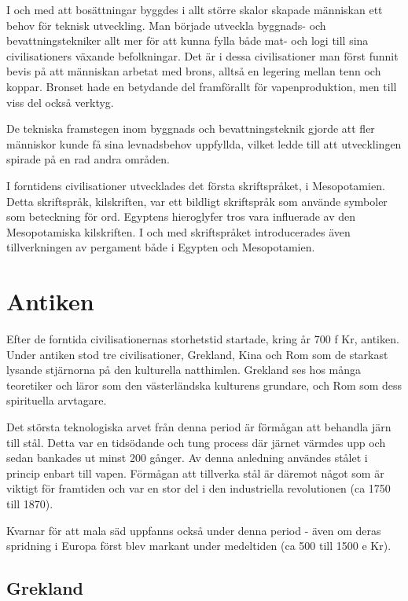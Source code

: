 \documentclass[a4paper,12pt,fleqn]{article}
\begin{document}
I och med att bosättningar byggdes i allt större skalor skapade människan ett behov för teknisk utveckling. Man började utveckla byggnads- och bevattningstekniker allt mer för att kunna fylla både mat- och logi till sina civilisationers växande befolkningar. Det är i dessa civilisationer man först funnit bevis på att människan arbetat med brons, alltså en legering mellan tenn och koppar. Bronset hade en betydande del framförallt för vapenproduktion, men till viss del också verktyg. 

De tekniska framstegen inom byggnads och bevattningsteknik gjorde att fler människor kunde få sina levnadsbehov uppfyllda, vilket ledde till att utvecklingen spirade på en rad andra områden. 

I forntidens civilisationer utvecklades det första skriftspråket, i Mesopotamien. Detta skriftspråk, kilskriften, var ett bildligt skriftspråk som använde symboler som beteckning för ord. Egyptens hieroglyfer tros vara influerade av den Mesopotamiska kilskriften. I och med skriftspråket introducerades även tillverkningen av pergament både i Egypten och Mesopotamien. 

\newpage
\section{Antiken}

Efter de forntida civilisationernas storhetstid startade, kring år 700 f Kr, antiken. Under antiken stod tre civilisationer, Grekland, Kina och Rom som de starkast lysande stjärnorna på den kulturella natthimlen. Grekland ses hos många teoretiker och läror som den västerländska kulturens grundare, och Rom som dess spirituella arvtagare. 

Det största teknologiska arvet från denna period är förmågan att behandla järn till stål. Detta var en tidsödande och tung process där järnet värmdes upp och sedan bankades ut minst 200 gånger. Av denna anledning användes stålet i princip enbart till vapen. Förmågan att tillverka stål är däremot något som är viktigt för framtiden och var en stor del i den industriella revolutionen (ca 1750 till 1870). 

Kvarnar för att mala säd uppfanns också under denna period - även om deras spridning i Europa först blev markant under medeltiden (ca 500 till 1500 e Kr). 

\subsection{Grekland}
\end{document}
